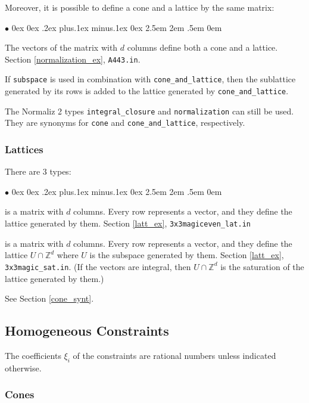 \documentclass[12pt,a4paper]{scrartcl}
\newcommand{\stdli}{ \topsep0ex \partopsep0ex %
\parsep.2ex plus.1ex minus.1ex \itemsep0ex%
\leftmargin2.5em \labelwidth2em \labelsep.5em \rightmargin0em}%
\renewenvironment{itemize}{\begin{list}{{$\bullet$}}{\stdli}}{\end{list}}
\theoremstyle{definition}
\def\ZZ{{\mathbb Z}}
\def\itemtt[#1]{\item[\textbf{\ttt{#1}}]}
\def\ttt{\texttt}
\begin{document}
Moreover, it is possible to define a cone and a lattice by the same matrix:

\begin{itemize}
	\itemtt[cone\_and\_lattice] The vectors of the matrix with $d$ columns define both a cone and a lattice. Section \ref{normalization_ex}, \verb|A443.in|.
	
	If \verb|subspace| is used in combination with \verb|cone_and_lattice|, then the sublattice generated by its rows is added to the lattice generated by \verb|cone_and_lattice|.
\end{itemize}


The Normaliz 2 types \verb|integral_closure| and \verb|normalization| can still be used. They are synonyms for \verb|cone| and \verb|cone_and_lattice|, respectively.

\subsubsection{Lattices}

There are $3$ types:

\begin{itemize}
	\itemtt[lattice] is a matrix with $d$ columns. Every row represents a vector, and they define the lattice generated by them. Section \ref{latt_ex}, \verb|3x3magiceven_lat.in|
	
	\itemtt[saturation] is a matrix with $d$ columns. Every row represents a vector, and they define the  lattice $U\cap \ZZ^d$ where $U$ is the subspace generated by them. Section \ref{latt_ex}, \verb|3x3magic_sat.in|. (If the vectors are integral, then $U\cap \ZZ^d$ is the saturation of the lattice generated by them.)
	
	\itemtt[cone\_and\_lattice] See Section \ref{cone_synt}.
\end{itemize}


\subsection{Homogeneous Constraints}

The coefficients $\xi_i$ of the constraints are rational numbers unless indicated otherwise.

\subsubsection{Cones} \label{HomConstrCone}
\end{document}
